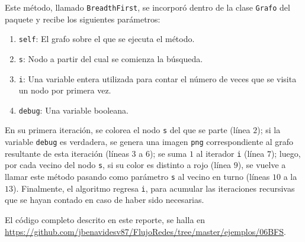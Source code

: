 \documentclass{article}
\begin{document}
  Este método, llamado \texttt{BreadthFirst}, se incorporó dentro de la clase \texttt{Grafo} del paquete y recibe los siguientes parámetros:
  \begin{enumerate}
    \item \texttt{self}: El grafo sobre el que se ejecuta el método.
    \item \texttt{s}: Nodo a partir del cual se comienza la búsqueda.
    \item \texttt{i}: Una variable entera utilizada para contar el número de veces que se visita un nodo por primera vez.
    \item \texttt{debug}: Una variable booleana.
  \end{enumerate}

  En su primera iteración, se colorea el nodo \texttt{s} del que se parte (línea $2$); si la variable \texttt{debug} es verdadera, se genera una imagen \texttt{png} correspondiente al grafo resultante de esta iteración (líneas $3$ a $6$); se suma $1$ al iterador \texttt{i} (línea $7$); luego, por cada vecino del nodo \texttt{s}, si su color es distinto a rojo (línea $9$), se vuelve a llamar este método pasando como parámetro \texttt{s} al vecino en turno (líneas $10$ a la $13$). Finalmente, el algoritmo regresa \texttt{i}, para acumular las iteraciones recursivas que se hayan contado en caso de haber sido necesarias.

  El código completo descrito en este reporte, se halla en \url{https://github.com/jbenavidesv87/FlujoRedes/tree/master/ejemplos/06BFS}.

  
  
\end{document}
